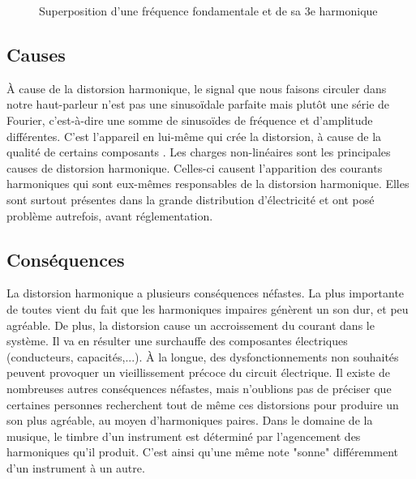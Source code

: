 \begin{figure}[ht!]
\centering
{}
\caption{Superposition d'une fréquence fondamentale et de sa 3e harmonique}
\label{lwp_ratio} 
\end{figure}

\subsection{Causes}
À cause de la distorsion harmonique, le signal que nous faisons circuler dans notre haut-parleur n'est pas
une sinusoïdale parfaite mais plutôt une série de Fourier, c'est-à-dire une somme de sinusoïdes de 
fréquence et d'amplitude différentes. C'est l'appareil en lui-même qui crée la distorsion, à cause de la qualité
de certains composants\cite{cuccia} \cite{termans}.
Les charges non-linéaires sont les principales causes de distorsion harmonique. Celles-ci causent 
l'apparition des courants harmoniques qui sont eux-mêmes responsables de la distorsion harmonique. Elles sont 
surtout présentes dans la grande distribution d'électricité et ont posé problème autrefois, avant réglementation\cite{chargeslin}.

\subsection{Conséquences}
La distorsion harmonique a plusieurs conséquences néfastes.
La plus importante de toutes vient du fait que les harmoniques impaires génèrent un son dur, et peu agréable. De plus, la distorsion cause un accroissement 
du courant dans le système. Il va en résulter une surchauffe des composantes électriques (conducteurs, 
capacités,...). À la longue, des dysfonctionnements non souhaités peuvent provoquer un vieillissement 
précoce du circuit électrique\cite{brevet2}. Il existe de nombreuses autres conséquences néfastes, 
mais n'oublions pas de préciser que certaines personnes recherchent tout de même ces distorsions pour 
produire un son plus agréable, au moyen d'harmoniques paires. Dans le domaine de la musique, le timbre 
d'un instrument est déterminé par l'agencement des harmoniques qu'il produit. C'est ainsi qu'une même note
"sonne" différemment d'un instrument à un autre.

